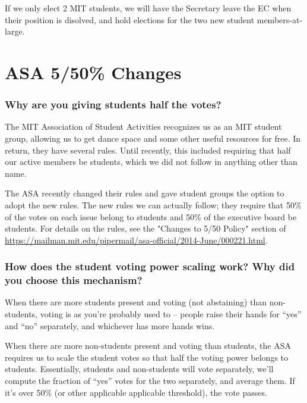 \documentclass{article}
\begin{document}
If we only elect 2 MIT students, we will have the Secretary leave the EC when their position is disolved, and hold elections for the two new student members-at-large.


\section{ASA 5/50\% Changes}

\subsubsection*{Why are you giving students half the votes?}
The MIT Association of Student Activities recognizes us as an MIT student group, allowing us to get dance space and some other useful resources for free. In return, they have several rules. Until recently, this included requiring that half our active members be students, which we did not follow in anything other than name.

The ASA recently changed their rules and gave student groups the option to adopt the new rules. The new rules we can actually follow; they require that 50\% of the votes on each issue belong to students and 50\% of the executive board be students. For details on the rules, see the "Changes to 5/50 Policy" section of \url{https://mailman.mit.edu/pipermail/asa-official/2014-June/000221.html}.

\subsubsection*{How does the student voting power scaling work? Why did you choose this mechanism?}

When there are more students present and voting (not abstaining) than non-students, voting is as you're probably used to -- people raise their hands for ``yes'' and ``no'' separately, and whichever has more hands wins.

When there are more non-students present and voting than students, the ASA requires us to scale the student votes so that half the voting power belongs to students. Essentially, students and non-students will vote separately, we'll compute the fraction of ``yes'' votes for the two separately, and average them. If it's over 50\% (or other applicable applicable threshold), the vote passes.
\end{document}

